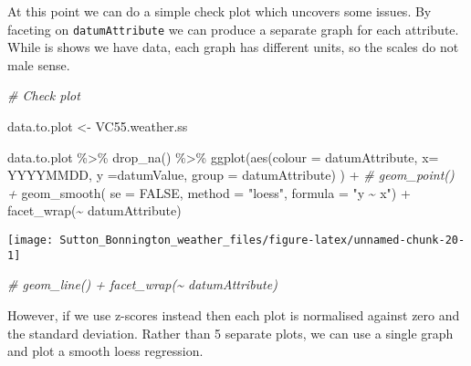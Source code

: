 \documentclass{article}
\newenvironment{Shaded}{\begin{snugshade}}{\end{snugshade}}
\newcommand{\AttributeTok}[1]{\textcolor[rgb]{0.77,0.63,0.00}{#1}}
\newcommand{\CommentTok}[1]{\textcolor[rgb]{0.56,0.35,0.01}{\textit{#1}}}
\newcommand{\ConstantTok}[1]{\textcolor[rgb]{0.00,0.00,0.00}{#1}}
\newcommand{\FunctionTok}[1]{\textcolor[rgb]{0.00,0.00,0.00}{#1}}
\newcommand{\NormalTok}[1]{#1}
\newcommand{\OtherTok}[1]{\textcolor[rgb]{0.56,0.35,0.01}{#1}}
\newcommand{\SpecialCharTok}[1]{\textcolor[rgb]{0.00,0.00,0.00}{#1}}
\newcommand{\StringTok}[1]{\textcolor[rgb]{0.31,0.60,0.02}{#1}}
\begin{document}
At this point we can do a simple check plot which uncovers some issues. By faceting on \texttt{datumAttribute} we can produce a separate graph for each attribute. While is shows we have data, each graph has different units, so the scales do not male sense.

\begin{Shaded}
\begin{Highlighting}[]
\CommentTok{\# Check plot}

\NormalTok{data.to.plot }\OtherTok{\textless{}{-}}\NormalTok{ VC55.weather.ss}

\NormalTok{data.to.plot }\SpecialCharTok{\%\textgreater{}\%} \FunctionTok{drop\_na}\NormalTok{() }\SpecialCharTok{\%\textgreater{}\%}
\FunctionTok{ggplot}\NormalTok{(}\FunctionTok{aes}\NormalTok{(}\AttributeTok{colour =}\NormalTok{ datumAttribute, }\AttributeTok{x=}\NormalTok{ YYYYMMDD, }\AttributeTok{y =}\NormalTok{datumValue, }\AttributeTok{group =}\NormalTok{ datumAttribute) ) }\SpecialCharTok{+} 
 \CommentTok{\# geom\_point() +}
  \FunctionTok{geom\_smooth}\NormalTok{( }\AttributeTok{se =} \ConstantTok{FALSE}\NormalTok{, }\AttributeTok{method =} \StringTok{"loess"}\NormalTok{, }\AttributeTok{formula =} \StringTok{"y \textasciitilde{} x"}\NormalTok{) }\SpecialCharTok{+}
  \FunctionTok{facet\_wrap}\NormalTok{(}\SpecialCharTok{\textasciitilde{}}\NormalTok{ datumAttribute)}
\end{Highlighting}
\end{Shaded}

\begin{center}\texttt{[image: Sutton\_Bonnington\_weather\_files/figure-latex/unnamed-chunk-20-1]} \end{center}

\begin{Shaded}
\begin{Highlighting}[]
 \CommentTok{\#   geom\_line() + facet\_wrap(\textasciitilde{} datumAttribute)}
\end{Highlighting}
\end{Shaded}

However, if we use z-scores instead then each plot is normalised against zero and the standard deviation. Rather than 5 separate plots, we can use a single graph and plot a smooth loess regression.
\end{document}
